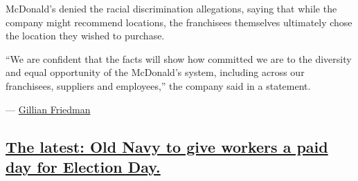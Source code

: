 McDonald's denied the racial discrimination allegations, saying that
while the company might recommend locations, the franchisees themselves
ultimately chose the location they wished to purchase.

``We are confident that the facts will show how committed we are to the
diversity and equal opportunity of the McDonald's system, including
across our franchisees, suppliers and employees,'' the company said in a
statement.

--- \href{http://nytimes3xbfgragh.onion/by/gillian-friedman}{Gillian
Friedman}

\hypertarget{the-latest-old-navy-to-give-workers-a-paid-day-for-election-day}{%
\subsection{\texorpdfstring{\protect\hyperlink{the-latest-old-navy-to-give-workers-a-paid-day-for-election-day}{The
latest: Old Navy to give workers a paid day for Election
Day.}}{The latest: Old Navy to give workers a paid day for Election Day.}}\label{the-latest-old-navy-to-give-workers-a-paid-day-for-election-day}}

